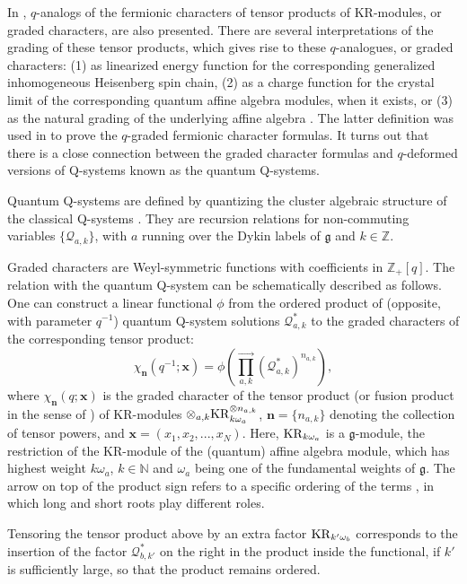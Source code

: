 \documentclass[12pt]{amsart}
\newcommand{\g}{{\mathfrak{g}}}
\newcommand{\KR}{{{\rm KR}}}
\newcommand{\Z}{{\mathbb Z}}
\newcommand{\Q}{{\mathcal Q}}
\newcommand{\N}{{\mathbb N}}
\newcommand{\bn}{{\mathbf n}}
\newcommand{\bx}{{\mathbf x}}
\numberwithin{equation}{section}
\numberwithin{table}{section}
\begin{document}
In \cite{KR,HKOTY}, $q$-analogs of the fermionic characters of tensor products of KR-modules, or graded characters, are also presented. There are several interpretations of the grading of these tensor products,
which gives rise to these $q$-analogues, or graded characters: (1) as linearized energy function for the
corresponding generalized inhomogeneous Heisenberg spin chain, (2) as a charge function for the crystal limit of the corresponding quantum affine algebra modules, when it exists, or (3) as the natural grading 
 of the underlying affine algebra \cite{FL}. The latter definition was used in \cite{AK,qKR,Simon} to prove the $q$-graded fermionic character formulas.  It turns out that there is a close connection between the graded character formulas and $q$-deformed versions of Q-systems known as the quantum Q-systems.
 
Quantum Q-systems are defined by quantizing \cite{BZ} the cluster algebraic \cite{FZ} structure of the classical Q-systems \cite{Ke07,DFKQcluster}.  They are recursion relations for non-commuting variables $\{\Q_{a,k}\}$, with $a$ running over the Dykin labels of $\g$ and $k\in\Z$.

Graded characters are Weyl-symmetric functions with coefficients in $\Z_+[q]$. The relation with the quantum Q-system can be schematically described as follows. One can construct a linear functional $\phi$ from the ordered product of (opposite, with parameter $q^{-1}$) quantum Q-system solutions $\Q_{a,k}^*$ to the graded characters  of the corresponding 
tensor product: 
\begin{equation}\label{linfun}
\chi_{\bn}(q^{-1};\bx)= \phi\left( {\displaystyle \prod_{a,k}^{\rightarrow} (\Q^*_{a,k})^{n_{a,k}}}\right),
\end{equation}
where $\chi_\bn(q;\bx)$ is the graded character of the tensor product (or fusion product in the sense of \cite{FL}) of KR-modules $\otimes_{a,k} \KR_{k\omega_a}^{\otimes n_{a,k}}$, $\bn=\{n_{a,k}\}$ denoting the collection of tensor powers,
and $\bx=(x_1,x_2,...,x_N)$. Here, $\KR_{k\omega_a}$ is a $\g$-module, the restriction of the KR-module of the (quantum) affine algebra module, which has highest weight $k\omega_a$, $k\in\N$ and $\omega_a$ being one of the fundamental weights of $\g$. The arrow on top of the product sign refers to a specific ordering of the terms \cite{qKR,Simon}, in which long and short roots play different roles.

Tensoring the tensor product above by an extra factor $\KR_{k'\omega_b}$  corresponds to the insertion of the factor $\Q_{b,k'}^*$ on the right in the product inside the functional, if $k'$ is sufficiently large, so that the product remains ordered.
\end{document}
